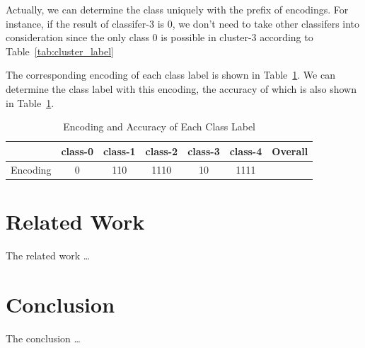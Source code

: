 \documentclass[sigplan,10pt,review]{acmart}\settopmatter{printfolios=true,printccs=false,printacmref=false}
\begin{document}
Actually, we can determine the class uniquely with the prefix of encodings. 
For instance, if the result of classifer-3 is $0$, we don't need to take other classifers into consideration since the only class $0$ is possible in cluster-3 according to Table~\ref{tab:cluster_label}

The corresponding encoding of each class label is shown in Table~\ref{tab:encoding-and-accuarcy}. We can determine the class label with this encoding, the accuracy of which is also shown in Table~\ref{tab:encoding-and-accuarcy}.

\begin{table}[!htp]
	\begin{tabular}{|c|c|c|c|c|c|c|}
	\hline
	& class-0 & class-1 & class-2 & class-3 & class-4 & Overall \\
	\hline
	Encoding &0 & 110 & 1110 &10 & 1111 &\\
	\hline
	\end{tabular}
    \caption{Encoding and Accuracy of Each Class Label}
    \label{tab:encoding-and-accuarcy}
\end{table}


\section{Related Work}
The related work \dots

\section{Conclusion}
The conclusion \dots


% 
% 




\end{document}

